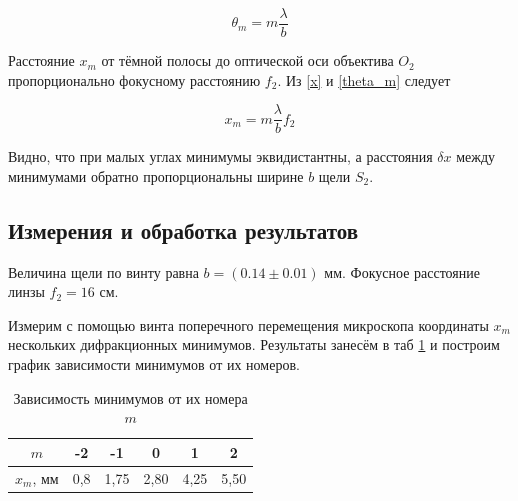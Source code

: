 \documentclass[a4paper,12pt]{article}
\begin{document}
\begin{equation}\label{theta_m}
\theta_m = m \dfrac{\lambda}{b}
\end{equation}

Расстояние $ x_m $ от тёмной полосы до оптической оси объектива $ O_2 $ пропорционально фокусному расстоянию $ f_2 $. Из \eqref{x} и \eqref{theta_m} следует 

\begin{equation}\label{xm}
x_m = m \dfrac{\lambda}{b} f_2
\end{equation}

Видно, что при малых углах минимумы эквидистантны, а расстояния $ \delta x $ между минимумами обратно пропорциональны ширине $ b $ щели $ S_2 $.

\subsection{Измерения и обработка результатов}

Величина щели по винту равна $ b = (0.14 \pm0.01)$ мм. Фокусное расстояние линзы $ f_2 = 16$ см.

Измерим с помощью винта поперечного перемещения микроскопа координаты $ x_m $ нескольких дифракционных минимумов.
Результаты занесём в таб \ref{tab2} и построим график зависимости минимумов от их номеров. 

\begin{table}[!ht]
	\caption{Зависимость минимумов от их номера $ m $}
	\begin{center}
		\begin{tabular}{|c|c|c|c|c|c|} \hline
			$m$ & -2 & -1 & 0 & 1 & 2 \\ \hline
			$ x_m $, мм &  0,8 & 1,75 & 2,80 & 4,25 & 5,50 \\ \hline
		\end{tabular}
	\end{center}
	\label{tab2}
\end{table}


\begin{center}
\end{center}
\end{document}
